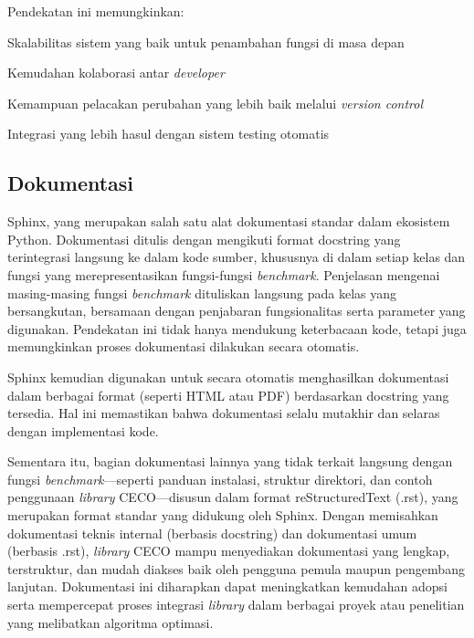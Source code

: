 Pendekatan ini memungkinkan:
\begin{packed_enum}
	\item Skalabilitas sistem yang baik untuk penambahan fungsi di masa depan
	\item Kemudahan kolaborasi antar \textit{developer} 
	\item Kemampuan pelacakan perubahan yang lebih baik melalui \textit{version control}
	\item Integrasi yang lebih hasul dengan sistem testing otomatis
\end{packed_enum}



\subsection{Dokumentasi}
Sphinx, yang merupakan salah satu alat dokumentasi standar dalam ekosistem Python. Dokumentasi ditulis dengan mengikuti format docstring yang terintegrasi langsung ke dalam kode sumber, khususnya di dalam setiap kelas dan fungsi yang merepresentasikan fungsi-fungsi \textit{benchmark}. Penjelasan mengenai masing-masing fungsi \textit{benchmark} dituliskan langsung pada kelas yang bersangkutan, bersamaan dengan penjabaran fungsionalitas serta parameter yang digunakan. Pendekatan ini tidak hanya mendukung keterbacaan kode, tetapi juga memungkinkan proses dokumentasi dilakukan secara otomatis.

Sphinx kemudian digunakan untuk secara otomatis menghasilkan dokumentasi dalam berbagai format (seperti HTML atau PDF) berdasarkan docstring yang tersedia. Hal ini memastikan bahwa dokumentasi selalu mutakhir dan selaras dengan implementasi kode.

Sementara itu, bagian dokumentasi lainnya yang tidak terkait langsung dengan fungsi \textit{benchmark}—seperti panduan instalasi, struktur direktori, dan contoh penggunaan \textit{library} CECO—disusun dalam format reStructuredText (.rst), yang merupakan format standar yang didukung oleh Sphinx. Dengan memisahkan dokumentasi teknis internal (berbasis docstring) dan dokumentasi umum (berbasis .rst), \textit{library} CECO mampu menyediakan dokumentasi yang lengkap, terstruktur, dan mudah diakses baik oleh pengguna pemula maupun pengembang lanjutan. Dokumentasi ini diharapkan dapat meningkatkan kemudahan adopsi serta mempercepat proses integrasi \textit{library} dalam berbagai proyek atau penelitian yang melibatkan algoritma optimasi.

